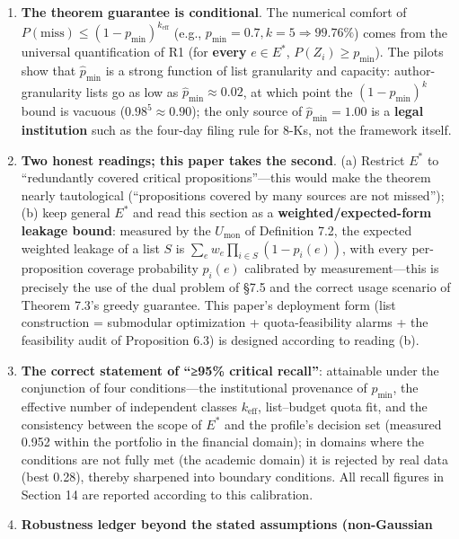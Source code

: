\documentclass[
  11pt]{article}
\providecommand{\tightlist}{%
  \setlength{\itemsep}{0pt}\setlength{\parskip}{0pt}}
\begin{document}
\begin{enumerate}
\def\labelenumi{\arabic{enumi}.}
\tightlist
\item
  \textbf{The theorem guarantee is conditional}. The numerical comfort
  of \(P(\mathrm{miss}) \le (1-p_{\min})^{k_{\mathrm{eff}}}\) (e.g.,
  \(p_{\min}=0.7, k=5 \Rightarrow 99.76\%\)) comes from the universal
  quantification of R1 (for \textbf{every} \(e \in E^*\),
  \(P(Z_i)\ge p_{\min}\)). The pilots show that \(\hat p_{\min}\) is a
  strong function of list granularity and capacity: author-granularity
  lists go as low as \(\hat p_{\min}\approx0.02\), at which point the
  \((1-\hat p_{\min})^k\) bound is vacuous (\(0.98^5\approx0.90\)); the
  only source of \(\hat p_{\min}=1.00\) is a \textbf{legal institution}
  such as the four-day filing rule for 8-Ks, not the framework itself.
\item
  \textbf{Two honest readings; this paper takes the second}. (a)
  Restrict \(E^*\) to ``redundantly covered critical
  propositions''---this would make the theorem nearly tautological
  (``propositions covered by many sources are not missed''); (b) keep
  general \(E^*\) and read this section as a
  \textbf{weighted/expected-form leakage bound}: measured by the
  \(U_{\mathrm{mon}}\) of Definition 7.2, the expected weighted leakage
  of a list \(S\) is \(\sum_e w_e\prod_{i\in S}(1-p_i(e))\), with every
  per-proposition coverage probability \(p_i(e)\) calibrated by
  measurement---this is precisely the use of the dual problem of §7.5
  and the correct usage scenario of Theorem 7.3's greedy guarantee. This
  paper's deployment form (list construction = submodular optimization +
  quota-feasibility alarms + the feasibility audit of Proposition 6.3)
  is designed according to reading (b).
\item
  \textbf{The correct statement of ``≥95\% critical recall''}:
  attainable under the conjunction of four conditions---the
  institutional provenance of \(p_{\min}\), the effective number of
  independent classes \(k_{\mathrm{eff}}\), list--budget quota fit, and
  the consistency between the scope of \(E^*\) and the profile's
  decision set (measured 0.952 within the portfolio in the financial
  domain); in domains where the conditions are not fully met (the
  academic domain) it is rejected by real data (best 0.28), thereby
  sharpened into boundary conditions. All recall figures in Section 14
  are reported according to this calibration.
\item
  \textbf{Robustness ledger beyond the stated assumptions (non-Gaussian
}
\end{enumerate}
\end{document}
